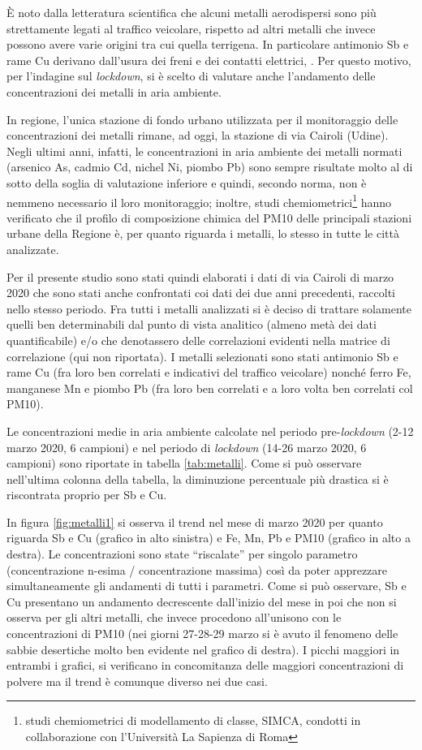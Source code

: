 È noto dalla letteratura scientifica che alcuni metalli aerodispersi sono più strettamente legati al traffico veicolare, rispetto ad altri metalli che invece possono avere varie origini tra cui quella terrigena. In particolare antimonio Sb e rame Cu derivano dall’usura dei freni e dei contatti elettrici, \cite{iijima2008emission,iijima2009clarification}.  Per questo motivo, per l’indagine sul \textit{lockdown}, si è scelto di valutare anche l’andamento delle concentrazioni dei metalli in aria ambiente.

In regione, l’unica stazione di fondo urbano utilizzata per il monitoraggio delle concentrazioni dei metalli rimane, ad oggi, la stazione di via Cairoli (Udine). Negli ultimi anni, infatti, le concentrazioni in aria ambiente dei metalli normati (arsenico As, cadmio Cd, nichel Ni, piombo Pb) sono sempre risultate molto al di sotto della soglia di valutazione inferiore e quindi, secondo norma, non è nemmeno necessario il loro monitoraggio; inoltre, studi chemiometrici\footnote{studi chemiometrici di modellamento di classe, SIMCA, condotti in collaborazione con l’Università La Sapienza di Roma} hanno verificato che il profilo di composizione chimica del PM10 delle principali stazioni urbane della Regione è, per quanto riguarda i metalli, lo stesso in tutte le città analizzate.

Per il presente studio sono stati quindi elaborati i dati di via Cairoli di marzo 2020 che sono stati anche confrontati coi dati dei due anni precedenti, raccolti nello stesso periodo. Fra tutti i metalli analizzati si è deciso di trattare solamente quelli ben determinabili dal punto di vista analitico (almeno metà dei dati quantificabile) e/o che denotassero delle correlazioni evidenti nella matrice di correlazione (qui non riportata). I metalli selezionati sono stati antimonio Sb e rame Cu (fra loro ben correlati e indicativi del traffico veicolare) nonché ferro Fe, manganese Mn e piombo Pb (fra loro ben correlati e a loro volta ben correlati col PM10).

Le concentrazioni medie in aria ambiente calcolate nel periodo pre-\textit{lockdown} (2-12 marzo 2020, 6 campioni) e nel periodo di \textit{lockdown} (14-26 marzo 2020, 6 campioni) sono riportate in tabella \ref{tab:metalli}. Come si può osservare nell’ultima colonna della tabella, la diminuzione percentuale più drastica si è riscontrata proprio per Sb e Cu.

In figura \ref{fig:metalli1} si osserva il trend nel mese di marzo 2020 per quanto riguarda Sb e Cu (grafico in alto sinistra) e Fe, Mn, Pb e PM10 (grafico in alto a destra). Le concentrazioni sono state “riscalate” per singolo parametro (concentrazione n-esima / concentrazione massima) così da poter apprezzare simultaneamente gli andamenti di tutti i parametri. Come si può osservare, Sb e Cu presentano un andamento decrescente dall’inizio del mese in poi che non si osserva per gli altri metalli, che invece procedono all’unisono con le concentrazioni di PM10 (nei giorni 27-28-29 marzo si è avuto il fenomeno delle sabbie desertiche molto ben evidente nel grafico di destra). I picchi maggiori in entrambi i grafici, si verificano in concomitanza delle maggiori concentrazioni di polvere ma il trend è comunque diverso nei due casi. 

